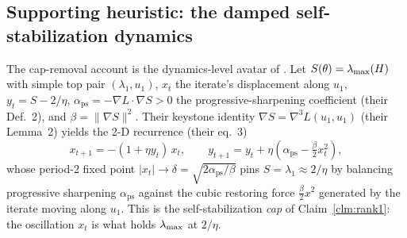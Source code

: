 \subsection{Supporting heuristic: the damped self-stabilization dynamics}
\label{app:mig-dyn}

The cap-removal account is the dynamics-level avatar of
\citet{damian2023selfstab}. Let $S(\theta)=\lambda_{\max}(H)$ with simple top pair
$(\lambda_{1},u_{1})$, $x_{t}$ the iterate's displacement along $u_{1}$,
$y_{t}=S-2/\eta$, $\alpha_{\mathrm{ps}}=-\nabla L\!\cdot\!\nabla S>0$ the progressive-sharpening
coefficient (their Def.~2), and $\beta=\|\nabla S\|^{2}$. Their keystone identity
$\nabla S=\nabla^{3}L(u_{1},u_{1})$ (their Lemma~2) yields the 2-D recurrence
(their eq.~3)
\begin{equation}
x_{t+1}=-(1+\eta y_{t})\,x_{t},\qquad
y_{t+1}=y_{t}+\eta\!\left(\alpha_{\mathrm{ps}}-\tfrac{\beta}{2}x_{t}^{2}\right),
\label{eq:damian}
\end{equation}
whose period-2 fixed point $|x_{t}|\!\to\!\delta=\sqrt{2\alpha_{\mathrm{ps}}/\beta}$ pins
$S=\lambda_{1}\approx 2/\eta$ by balancing progressive sharpening $\alpha_{\mathrm{ps}}$
against the cubic restoring force $\tfrac{\beta}{2}x^{2}$ generated by the
iterate moving along $u_{1}$. This is the self-stabilization \emph{cap} of
Claim~\ref{clm:rank1}: the oscillation $x_{t}$ is what holds $\lambda_{\max}$ at $2/\eta$.

